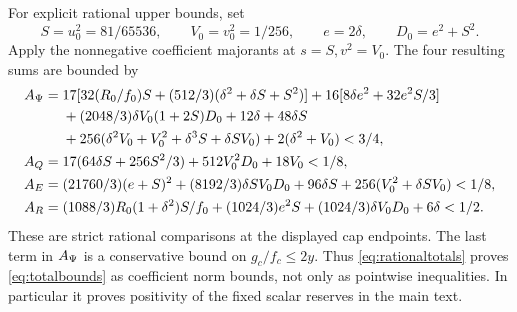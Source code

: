 For explicit rational upper bounds, set
\[
 S=u_0^2=81/65536,\qquad V_0=v_0^2=1/256,\qquad
 e=2\delta,\qquad D_0=e^2+S^2.
\]
Apply the nonnegative coefficient majorants at $s=S,v^2=V_0$.
The four resulting sums are bounded by
\begin{align}
 A_\Psi={}&17[32(R_0/f_0)S+(512/3)(\delta^2+\delta S+S^2)]
 +16[8\delta e^2+32e^2S/3]\notag\\
 &+(2048/3)\delta V_0(1+2S)D_0
 +12\delta+48\delta S \notag\\
 &+256(\delta^2V_0+V_0^2+\delta^3S+\delta SV_0)
 +2(\delta^2+V_0)<3/4,\notag\\
 A_Q={}&17(64\delta S+256S^2/3)+512V_0^2D_0+18V_0<1/8,\notag\\
 A_E={}&(21760/3)(e+S)^2+(8192/3)\delta SV_0D_0
       +96\delta S+256(V_0^2+\delta SV_0)<1/8,\notag\\
 A_R={}&(1088/3)R_0(1+\delta^2)S/f_0+(1024/3)e^2S
                +(1024/3)\delta V_0D_0+6\delta<1/2 .
 \label{eq:rationaltotals}
\end{align}
These are strict rational comparisons at the displayed cap endpoints.
The last term in $A_\Psi$ is a conservative bound on $g_c/f_c\leq2y$.
Thus \eqref{eq:rationaltotals} proves \eqref{eq:totalbounds} as coefficient
norm bounds, not only as pointwise inequalities. In particular it proves
positivity of the fixed scalar reserves in the main text.
